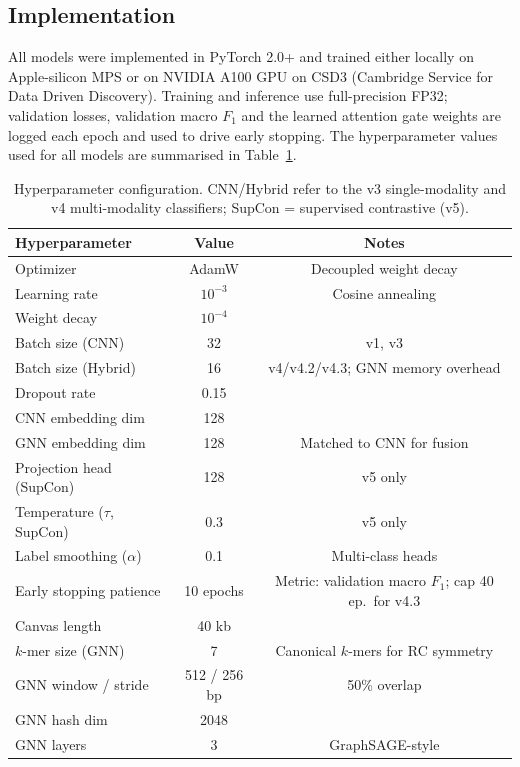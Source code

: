 \documentclass[12pt]{article}
\begin{document}
\subsection{Implementation}\label{ssec:implementation}

All models were implemented in PyTorch 2.0+ and trained either locally on Apple-silicon MPS or on NVIDIA A100 GPU on CSD3 (Cambridge Service for Data Driven Discovery). Training and inference use full-precision FP32; validation losses, validation macro $F_1$ and the learned attention gate weights are logged each epoch and used to drive early stopping. The hyperparameter values used for all models are summarised in Table~\ref{tab:hyperparams}. 

\begin{table}[h]
\centering
\begin{tabular}{lcc}
\hline
Hyperparameter & Value & Notes \\
\hline
Optimizer & AdamW & Decoupled weight decay \\
Learning rate & $10^{-3}$ & Cosine annealing \\
Weight decay & $10^{-4}$ & \\
Batch size (CNN) & 32 & v1, v3 \\
Batch size (Hybrid) & 16 & v4/v4.2/v4.3; GNN memory overhead \\
Dropout rate & 0.15 & \\
CNN embedding dim & 128 & \\
GNN embedding dim & 128 & Matched to CNN for fusion \\
Projection head (SupCon) & 128 & v5 only \\
Temperature ($\tau$, SupCon) & 0.3 & v5 only \cite{khosla2020supervised} \\
Label smoothing ($\alpha$) & 0.1 & Multi-class heads \\
Early stopping patience & 10 epochs & Metric: validation macro $F_1$; cap 40 ep.~for v4.3 \\
Canvas length & 40 kb & \\
$k$-mer size (GNN) & 7 & Canonical $k$-mers for RC symmetry \\
GNN window / stride & 512 / 256 bp & 50\% overlap \\
GNN hash dim & 2048 & \\
GNN layers & 3 & GraphSAGE-style \\
\hline
\end{tabular}
\caption{Hyperparameter configuration. CNN/Hybrid refer to the v3 single-modality and v4 multi-modality classifiers; SupCon = supervised contrastive (v5).}
\label{tab:hyperparams}
\end{table}
\end{document}
